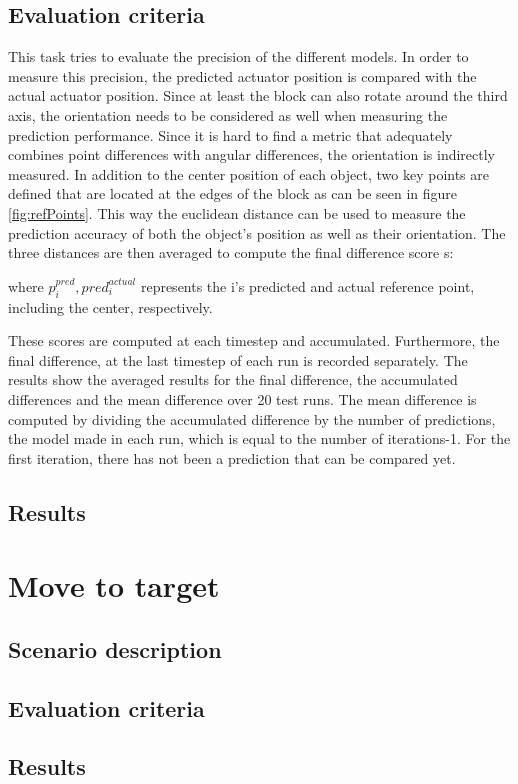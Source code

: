 \subsection{Evaluation criteria}

This task tries to evaluate the precision of the different models. In order to measure this precision, the predicted actuator position
is compared with the actual actuator position. Since at least the block can also rotate around the third axis, the orientation needs to be
considered as well when measuring the prediction performance. Since it is hard to find a metric that adequately combines point differences with
angular differences, the orientation is indirectly measured. In addition to the center position of each object, two key points are defined that
are located at the edges of the block as can be seen in figure \ref{fig:refPoints}. This way the euclidean distance can be used to measure the
prediction accuracy of both the object's position as well as their orientation. The three distances are then averaged to compute the final difference
score s:


where $p^{pred}_i, pred^{actual}_i$ represents the i's predicted and actual reference point, including the center, respectively.

These scores are computed at each timestep and accumulated. Furthermore, the final difference, at the last timestep of each run is recorded separately.
The results show the averaged results for the final difference, the accumulated differences and the mean difference over 20 test runs. The mean difference
is computed by dividing the accumulated difference by the number of predictions, the model made in each run, which is equal to the number of iterations-1. For the
first iteration, there has not been a prediction that can be compared yet.

\subsection{Results}




\section{Move to target \label{sec:moveToTarget}}

\subsection{Scenario description}

\subsection{Evaluation criteria}

\subsection{Results}